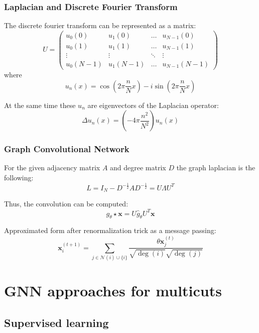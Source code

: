 \documentclass{beamer}
\begin{document}
\begin{frame}
    \frametitle{Laplacian and Discrete Fourier Transform}
    The discrete fourier transform can be represented as a matrix:
    \[
        U = \begin{pmatrix}
            u_0(0)   & u_1(0)   & \dots  & u_{N-1}(0)   \\
            u_0(1)   & u_1(1)   & \dots  & u_{N-1}(1)   \\
            \vdots   & \vdots   & \ddots & \vdots       \\
            u_0(N-1) & u_1(N-1) & \dots  & u_{N-1}(N-1)
        \end{pmatrix}
    \]
    where
    \[
        u_n(x) = \cos\left(2 \pi \frac{n}{N} x \right) -
        i \sin\left(2 \pi \frac{n}{N} x \right)
    \]

    At the same time these $u_n$ are eigenvectors of the
    Laplacian operator:
    \[
        \Delta u_n(x) = \left( -4 \pi \frac{n^2}{N^2} \right) u_n(x)
    \]

\end{frame}

\begin{frame}
    \frametitle{Graph Convolutional Network}

    For the given adjacency matrix $A$ and degree matrix $D$ the
    graph laplacian is the following:
    \[
        L = I_N - D^{-\frac{1}{2}} A D^{-\frac{1}{2}} = U \Lambda U^T
    \]

    Thus, the convolution can be computed:
    \[
        g_{\theta} \star \mathbf{x} = U \hat{g}_{\theta} U^T \mathbf{x}
    \]

    Approximated form \cite{kipf2016semi} after renormalization trick as a message passing:
    \[
        \mathbf{x}_i^{(t+1)} =
        \sum_{j \in \mathcal{N}(i) \cup \{ i \}}
        \frac{\theta \mathbf{x}_j^{(t)}}
        {\sqrt{\deg(i)} \sqrt{\deg(j)}}
    \]

\end{frame}

\section{GNN approaches for multicuts}

\subsection{Supervised learning}
\end{document}
